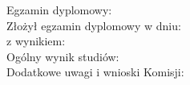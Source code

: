 \newpage
	\thispagestyle{empty}
\begin{flushleft}
    	\begin{minipage}{11cm}
		Egzamin dyplomowy: \\
		Złożył egzamin dyplomowy w dniu: \dotfill \\
		z wynikiem: \dotfill \\
		Ogólny wynik studiów: \dotfill \\
		Dodatkowe uwagi i wnioski Komisji: \dotfill \\
		\dotfill
	\end{minipage}
\end{flushleft}